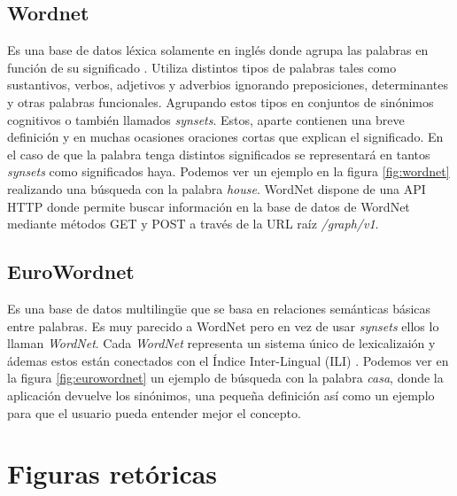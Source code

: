 \subsection{Wordnet}
\label{cap:subsec:wordnet}
Es una base de datos léxica solamente en inglés donde agrupa las palabras en función de su significado \citep{wordnet2010}. Utiliza distintos tipos de palabras tales como sustantivos, verbos, adjetivos y adverbios ignorando preposiciones, determinantes y otras palabras funcionales. Agrupando estos tipos en conjuntos de sinónimos cognitivos o también llamados \textit{synsets}. Estos, aparte contienen una breve definición y en muchas ocasiones oraciones cortas que explican el significado. En el caso de que la palabra tenga distintos significados se representará en tantos \textit{synsets} como significados haya. Podemos ver un ejemplo en la figura \ref{fig:wordnet} realizando una búsqueda con la palabra \textit{house}.
WordNet dispone de una API HTTP donde permite buscar información en la base de datos de WordNet mediante métodos GET y POST a través de la URL raíz \textit{/graph/v1}.


\subsection{EuroWordnet}
\label{cap:subsec:eurowordnet}
Es una base de datos multilingüe que se basa en relaciones semánticas básicas entre palabras. Es muy parecido a WordNet pero en vez de usar \textit{synsets} ellos lo llaman \textit{WordNet}. Cada \textit{WordNet} representa un sistema único de lexicalizaión y ádemas estos están conectados con el Índice Inter-Lingual (ILI) \citep{wiki:eurowordnet2017}.
Podemos ver en la figura \ref{fig:eurowordnet} un ejemplo de búsqueda con la palabra  \textit{casa}, donde la aplicación devuelve los sinónimos, una pequeña definición así como un ejemplo para que el usuario pueda entender mejor el concepto.



\section{Figuras retóricas}
\label{cap:sec:figurasretoricas}


